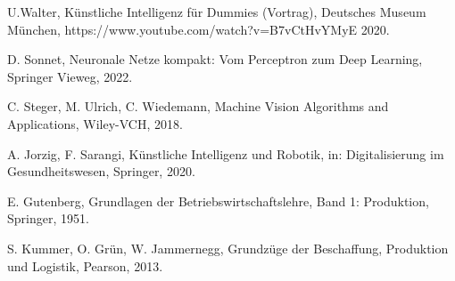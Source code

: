 \begin{thebibliography}{99}
	U.Walter,
	Künstliche Intelligenz für Dummies (Vortrag),
	Deutsches Museum München,
	https://www.youtube.com/watch?v=B7vCtHvYMyE
	2020.

	D. Sonnet,
	Neuronale Netze kompakt: Vom Perceptron zum Deep Learning,
	Springer Vieweg,
	2022.

	C. Steger, M. Ulrich, C. Wiedemann,
	Machine Vision Algorithms and Applications,
	Wiley-VCH,
	2018.

	A. Jorzig, F. Sarangi,
	Künstliche Intelligenz und Robotik, 
	in: Digitalisierung im Gesundheitswesen,
	Springer,
	2020.

	E. Gutenberg,
	Grundlagen der Betriebswirtschaftslehre, Band 1: Produktion,
	Springer,
	1951.

	S. Kummer, O. Grün, W. Jammernegg,
	Grundzüge der Beschaffung, Produktion und Logistik,
	Pearson,
	2013.

	


\end{thebibliography}